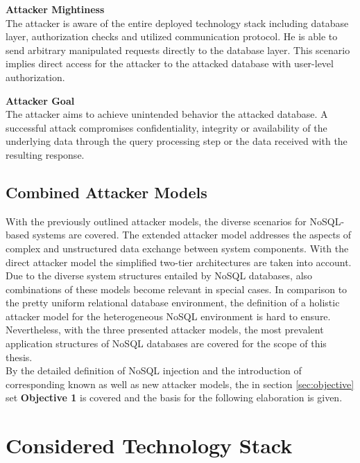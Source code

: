 \begin{minipage}[t]{0.48\textwidth}
  \textbf{Attacker Mightiness} \\ 
  The attacker is aware of the entire deployed technology stack including database layer, authorization checks and utilized communication protocol. He is able to send arbitrary manipulated requests directly to the database layer. This scenario implies direct access for the attacker to the attacked database with user-level authorization.
\end{minipage}
\hfill
\begin{minipage}[t]{0.48\textwidth}
  \textbf{Attacker Goal} \\ 
  The attacker aims to achieve unintended behavior the attacked database. A successful attack compromises confidentiality, integrity or availability of the underlying data through the query processing step or the data received with the resulting response.
\end{minipage}

\subsection{Combined Attacker Models}
With the previously outlined attacker models, the diverse scenarios for NoSQL-based systems are covered. The extended attacker model addresses the aspects of complex and unstructured data exchange between system components. With the direct attacker model the simplified two-tier architectures are taken into account. Due to the diverse system structures entailed by NoSQL databases, also combinations of these models become relevant in special cases. In comparison to the pretty uniform relational database environment, the definition of a holistic attacker model for the heterogeneous NoSQL environment is hard to ensure. Nevertheless, with the three presented attacker models, the most prevalent application structures of NoSQL databases are covered for the scope of this thesis. \\

By the detailed definition of NoSQL injection and the introduction of corresponding known as well as new attacker models, the in section \ref{sec:objective} set \textbf{Objective 1} is covered and the basis for the following elaboration is given.


\section{Considered Technology Stack}

